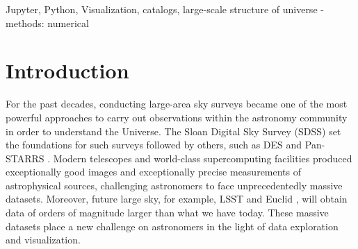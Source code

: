 \documentclass[5p,authoryear]{elsarticle}
\begin{document}
\begin{keyword}
Jupyter, Python, Visualization, catalogs, large-scale structure of universe - methods: numerical
\end{keyword}

\maketitle

\section{Introduction}
For the past decades, conducting large-area sky surveys became one of the most powerful approaches to carry out observations within the astronomy community in order to understand the Universe. The Sloan Digital Sky Survey (SDSS) \citep{sdssYork2000} set the foundations for such surveys followed by others, such as DES and Pan-STARRS \citep{des, PanSTARRS}. Modern telescopes and world-class supercomputing facilities produced exceptionally good images and exceptionally precise measurements of astrophysical sources, challenging astronomers to face unprecedentedly massive datasets.
Moreover, future large sky, for example, LSST and Euclid \citep{lsstOverview,lsstSci,euclid}, will obtain data of orders of magnitude larger than what we have today. These massive datasets place a new challenge on astronomers in the light of data exploration and visualization.
\end{document}
